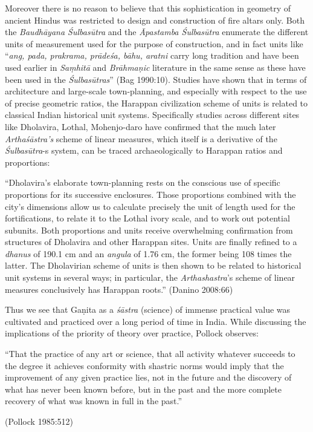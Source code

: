 Moreover there is no reason to believe that this sophistication in geometry of ancient Hindus was restricted to design and construction of fire altars only. Both the {\sl Baudhāyana Śulbasūtra} and the {\sl Āpastamba Śulbasūtra} enumerate the different units of measurement used for the purpose of construction, and in fact units like ``{\sl ang, pada, prakrama, prādeśa, bāhu, aratni} carry long tradition and have been used earlier in {\sl Saṃhitā} and {\sl Brāhmaṇic} literature in the same sense as these have been used in the {\sl Śulbasūtras}'' (Bag 1990:10). Studies have shown that in terms of architecture and large-scale town-planning, and especially with respect to the use of precise geometric ratios, the Harappan civilization scheme of units is related to classical Indian historical unit systems. Specifically studies across different sites like Dholavira, Lothal, Mohenjo-daro have confirmed that the much later {\sl Arthaśāstra’s} scheme of linear measures, which itself is a derivative of the {\sl Śulbasūtra}-s system, can be traced archaeologically to Harappan ratios and proportions: 
\begin{myquote}
``Dholavira’s elaborate town-planning rests on the conscious use of specific proportions for its successive enclosures. Those proportions combined with the city’s dimensions allow us to calculate precisely the unit of length used for the fortifications, to relate it to the Lothal ivory scale, and to work out potential subunits. Both proportions and units receive overwhelming confirmation from structures of Dholavira and other Harappan sites. Units are finally refined to a {\sl dhanus} of 190.1 cm and an {\sl angula} of 1.76 cm, the former being 108 times the latter. The Dholavirian scheme of units is then shown to be related to historical unit systems in several ways; in particular, the {\sl Arthashastra}’s scheme of linear measures conclusively has Harappan roots.'' (Danino 2008:66)
\end{myquote}

Thus we see that Gaṇita as a {\sl śāstra} (science) of immense practical value was cultivated and practiced over a long period of time in India. While discussing the implications of the priority of theory over practice, Pollock observes: 
\begin{myquote}
``That the practice of any art or science, that all activity whatever succeeds to the degree it achieves conformity with shastric norms would imply that the improvement of any given practice lies, not in the future and the discovery of what has never been known before, but in the past and the more complete recovery of what was known in full in the past.''

\hfill (Pollock 1985:512)
\end{myquote}

